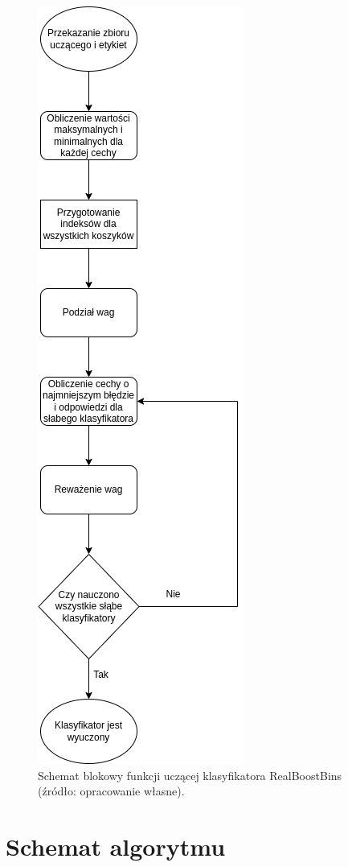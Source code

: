 \begin{figure}[!ht]
    \centering
    \includegraphics[scale=0.4]{Pictures/fit_realboostbins}
    \caption{Schemat blokowy funkcji uczącej klasyfikatora RealBoostBins (źródło: opracowanie własne).}
    \label{fig:fit_realboostbins}
\end{figure}
\FloatBarrier


\section{Schemat algorytmu}

